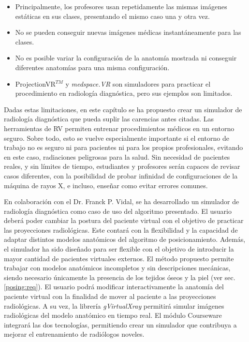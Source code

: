 \begin{itemize}
\item Principalmente, los profesores usan repetidamente las mismas imágenes estáticas en sus clases, presentando el mismo caso una y otra vez.
\item No se pueden conseguir nuevas imágenes médicas instantáneamente para las clases.
\item No es posible variar la configuración de la anatomía mostrada ni conseguir diferentes anatomías para una misma configuración.
\item ProjectionVR$^{TM}$\cite{shanahan2016student} y \emph{medspace.VR} \cite{medspace} son simuladores para practicar el procedimiento en radiología diagnóstica, pero sus ejemplos son limitados.
\end{itemize}

Dadas estas limitaciones, en este capítulo se ha propuesto crear un simulador de radiología diagnóstica que pueda suplir las carencias antes citadas. Las herramientas de \ac{RV} permiten entrenar procedimientos médicos en un entorno seguro. Sobre todo, esto se vuelve especialmente importante si el entorno de trabajo no es seguro ni para pacientes ni para los propios profesionales, evitando en este caso, radiaciones peligrosas para la salud. Sin necesidad de pacientes reales, y sin límites de tiempo, estudiantes y profesores serán capaces de revisar casos diferentes, con la posibilidad de probar infinidad de configuraciones de la máquina de rayos X, e incluso, enseñar como evitar errores comunes.%




En colaboración con el Dr. Franck P. Vidal, se ha desarrollado un simulador de radiología diagnóstica como caso de uso del algoritmo presentado.  El usuario deberá poder cambiar la postura del paciente virtual con el objetivo de practicar las proyecciones radiológicas.
Este contará con la flexibilidad y la capacidad de %
adaptar distintos modelos anatómicos del algoritmo de posicionamiento.
Además, el simulador ha sido diseñado para ser flexible con el objetivo de introducir la mayor cantidad de pacientes virtuales externos. El método propuesto permite trabajar con modelos anatómicos incompletos y sin descripciones mecánicas, siendo necesario únicamente la presencia de los tejidos óseos y la piel (ver sec. \ref{posing:req}). El usuario podrá modificar interactivamente la anatomía del paciente virtual con la finalidad de mover al paciente a las proyecciones radiológicas. %
A su vez, la librería \emph{gVirtualXray}\cite{sujar:hal}  permitirá simular imágenes radiológicas del modelo anatómico en tiempo real. El módulo \ac{Courseware} integrará las dos tecnologías, permitiendo crear un simulador que contribuya a mejorar el entrenamiento de radiólogos noveles.


